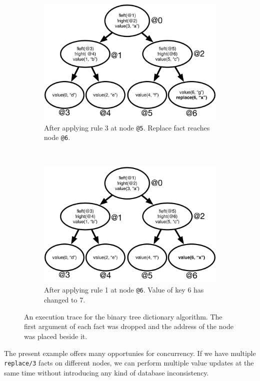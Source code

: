 \begin{figure}[h]
        \begin{subfigure}[b]{0.5\textwidth}
                \includegraphics[width=\textwidth]{figures/btree/btree_trace3}
                \caption{After applying rule 3 at node \texttt{@5}. Replace fact
                   reaches node \texttt{@6}.}
                \label{fig:btree_trace3}
        \end{subfigure}%
        ~
        \begin{subfigure}[b]{0.5\textwidth}
                  \includegraphics[width=\textwidth]{figures/btree/btree_trace4}
                  \caption{After applying rule 1 at node \texttt{@6}. Value of key 6 has changed to 7.}
                  \label{fig:btree_trace4}
          \end{subfigure}
        \caption{An execution trace for the binary tree dictionary
           algorithm. The first argument of each fact was dropped and the
           address of the node was placed beside it.}\label{fig:btree_trace}
\end{figure}

The present example offers many opportunies for concurrency. If we have multiple
\texttt{replace/3} facts on different nodes, we can perform multiple value
updates at the same time without introducing any kind of database inconsistency.

